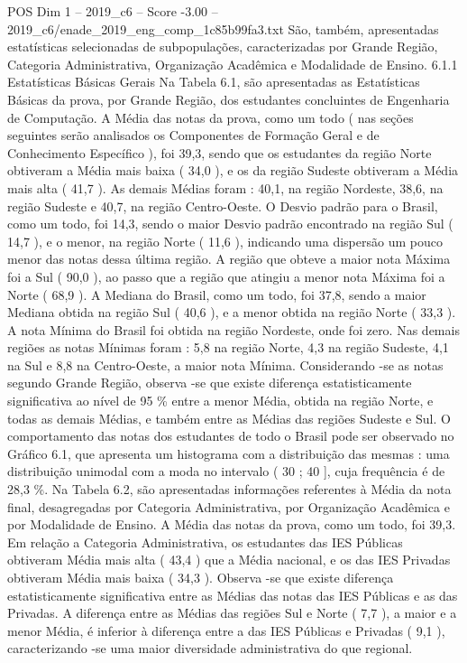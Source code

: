\begin{textsample}{POS Dim 1 – 2019\_c6 – Score -3.00 – 2019\_c6/enade\_2019\_eng\_comp\_1c85b99fa3.txt}
São, também, apresentadas estatísticas selecionadas de subpopulações, caracterizadas por Grande Região, Categoria Administrativa, Organização Acadêmica e Modalidade de Ensino. 6.1.1 Estatísticas Básicas Gerais Na Tabela 6.1, são apresentadas as Estatísticas Básicas da prova, por Grande Região, dos estudantes concluintes de Engenharia de Computação.
A Média das notas da prova, como um todo ( nas seções seguintes serão analisados os Componentes de Formação Geral e de Conhecimento Específico ), foi 39,3, sendo que os estudantes da região Norte obtiveram a Média mais baixa ( 34,0 ), e os da região Sudeste obtiveram a Média mais alta ( 41,7 ).
As demais Médias foram : 40,1, na região Nordeste, 38,6, na região Sudeste e 40,7, na região Centro-Oeste.
O Desvio padrão para o Brasil, como um todo, foi 14,3, sendo o maior Desvio padrão encontrado na região Sul ( 14,7 ), e o menor, na região Norte ( 11,6 ), indicando uma dispersão um pouco menor das notas dessa última região.
A região que obteve a maior nota Máxima foi a Sul ( 90,0 ), ao passo que a região que atingiu a menor nota Máxima foi a Norte ( 68,9 ).
A Mediana do Brasil, como um todo, foi 37,8, sendo a maior Mediana obtida na região Sul ( 40,6 ), e a menor obtida na região Norte ( 33,3 ).
A nota Mínima do Brasil foi obtida na região Nordeste, onde foi zero.
Nas demais regiões as notas Mínimas foram : 5,8 na região Norte, 4,3 na região Sudeste, 4,1 na Sul e 8,8 na Centro-Oeste, a maior nota Mínima.
Considerando -se as notas segundo Grande Região, observa -se que existe diferença estatisticamente significativa ao nível de 95 \% entre a menor Média, obtida na região Norte, e todas as demais Médias, e também entre as Médias das regiões Sudeste e Sul.
O comportamento das notas dos estudantes de todo o Brasil pode ser observado no Gráfico 6.1, que apresenta um histograma com a distribuição das mesmas : uma distribuição unimodal com a moda no intervalo ( 30 ; 40 ], cuja frequência é de 28,3 \%.
Na Tabela 6.2, são apresentadas informações referentes à Média da nota final, desagregadas por Categoria Administrativa, por Organização Acadêmica e por Modalidade de Ensino.
A Média das notas da prova, como um todo, foi 39,3.
Em relação a Categoria Administrativa, os estudantes das IES Públicas obtiveram Média mais alta ( 43,4 ) que a Média nacional, e os das IES Privadas obtiveram Média mais baixa ( 34,3 ).
Observa -se que existe diferença estatisticamente significativa entre as Médias das notas das IES Públicas e as das Privadas.
A diferença entre as Médias das regiões Sul e Norte ( 7,7 ), a maior e a menor Média, é inferior à diferença entre a das IES Públicas e Privadas ( 9,1 ), caracterizando -se uma maior diversidade administrativa do que regional.

\end{textsample}
